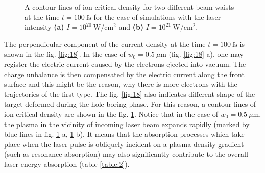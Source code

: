 \begin{figure}[h!]
	\centering
	\hspace{1mm}
	\caption{A contour lines of ion critical density for two different beam waists at the time $ t = 100 \ \mathrm{fs} $ for the case of simulations with the laser intensity \textbf{(a)} $ I = 10^{20} \ \mathrm{W/cm^2} $ and \textbf{(b)} $ I = 10^{21} \ \mathrm{W/cm^2} $.}
	\label{fig:15}
\end{figure}

The perpendicular component of the current density at the time $ t = 100 \ \mathrm{fs} $ is shown in the fig. \ref{fig:18}. In the case of $ w_0 = 0.5 \ \mu\mathrm{m} $ (fig. \ref{fig:18}-a), one may register the electric current caused by the electrons ejected into vacuum. The charge unbalance is then compensated by the electric current along the front surface and this might be the reason, why there is more electrons with the trajectories of the first type. The fig. \ref{fig:18} also indicates different shape of the target deformed during the hole boring phase. For this reason, a contour lines of ion critical density are shown in the fig. \ref{fig:15}. Notice that in the case of $ w_0 = 0.5 \ \mu\mathrm{m} $, the plasma in the vicinity of incoming laser beam expands rapidly (marked by blue lines in fig. \ref{fig:15}-a, \ref{fig:15}-b). It means that the absorption processes which take place when the laser pulse is obliquely incident on a plasma density gradient (such as resonance absorption) may also significantly contribute to the overall laser energy absorption (table \ref{table:2}).

